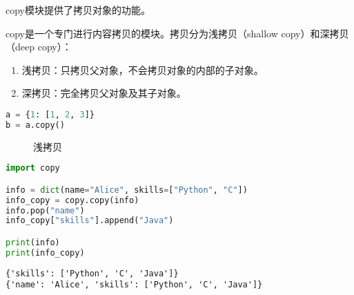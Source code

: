 copy模块提供了拷贝对象的功能。

copy是一个专门进行内容拷贝的模块。拷贝分为浅拷贝（shallow copy）和深拷贝（deep copy）：

\begin{enumerate}
    \item 浅拷贝：只拷贝父对象，不会拷贝对象的内部的子对象。
    \item 深拷贝：完全拷贝父对象及其子对象。
\end{enumerate}

\vspace{-0.5cm}

\begin{lstlisting}[language=Python]
a = {1: [1, 2, 3]}
b = a.copy()
\end{lstlisting}

\begin{figure}[H]
    \centering
    \caption{浅拷贝}
\end{figure}

\vspace{0.5cm}


\begin{lstlisting}[language=Python]
import copy

info = dict(name="Alice", skills=["Python", "C"])
info_copy = copy.copy(info)
info.pop("name")
info_copy["skills"].append("Java")

print(info)
print(info_copy)
\end{lstlisting}

\newpage

\begin{tcolorbox}
    \begin{verbatim}
{'skills': ['Python', 'C', 'Java']}
{'name': 'Alice', 'skills': ['Python', 'C', 'Java']}
\end{verbatim}
\end{tcolorbox}

